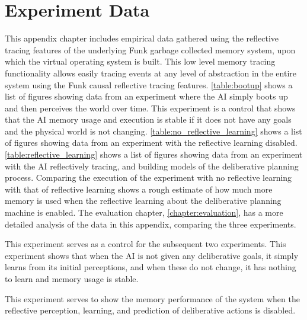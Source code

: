 \chapter{Experiment Data}
\label{chapter:experiment_data}

This appendix chapter includes empirical data gathered using the
reflective tracing features of the underlying Funk garbage collected
memory system, upon which the virtual operating system is built.  This
low level memory tracing functionality allows easily tracing events at
any level of abstraction in the entire system using the Funk causal
reflective tracing features.  \autoref{table:bootup} shows a list of
figures showing data from an experiment where the AI simply boots up
and then perceives the world over time.  This experiment is a control
that shows that the AI memory usage and execution is stable if it does
not have any goals and the physical world is not changing.
\autoref{table:no_reflective_learning} shows a list of figures showing
data from an experiment with the reflective learning disabled.
\autoref{table:reflective_learning} shows a list of figures showing
data from an experiment with the AI reflectively tracing, and building
models of the deliberative planning process.  Comparing the execution
of the experiment with no reflective learning with that of reflective
learning shows a rough estimate of how much more memory is used when
the reflective learning about the deliberative planning machine is
enabled.  The evaluation chapter, \autoref{chapter:evaluation}, has a
more detailed analysis of the data in this appendix, comparing the
three experiments.

 {This experiment serves as a
  control for the subsequent two experiments.  This experiment shows
  that when the AI is not given any deliberative goals, it simply
  learns from its initial perceptions, and when these do not change,
  it has nothing to learn and memory usage is stable.}

 {This experiment serves to show the memory
  performance of the system when the reflective perception, learning,
  and prediction of deliberative actions is disabled.}

